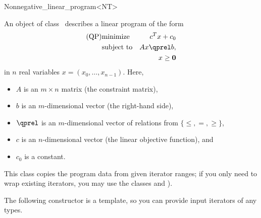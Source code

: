 \begin{ccRefClass}{Nonnegative_linear_program<NT>}


\ccDefinition
An object of class \ccRefName\ describes a linear program of the form
\begin{eqnarray*}
\mbox{(QP)}& \mbox{minimize} & c^{T}x+c_0 \\
&\mbox{subject to}   & Ax\qprel b, \\
&                    & x \geq \mathbf{0} 
\end{eqnarray*}
in $n$ real variables $x=(x_0,\ldots,x_{n-1})$.
Here, 
\begin{itemize}
\item $A$ is an $m\times n$ matrix (the constraint matrix), 
\item $b$ is an $m$-dimensional vector (the right-hand side),
\item $\qprel$ is an $m$-dimensional vector of relations 
from $\{\leq, =, \geq\}$, 
\item $c$ is an $n$-dimensional vector (the linear objective
  function), and 
\item $c_0$ is a constant.
\end{itemize}

This class copies the program data from given iterator ranges; 
if you only need to wrap existing iterators, you may use the classes 
 and ).

\ccIsModel
{}

\ccCreation
\ccIndexClassCreation
{}

The following constructor is a template, so you can provide input
iterators of any types.


\ccSeeAlso
{}\\

\end{ccRefClass}
